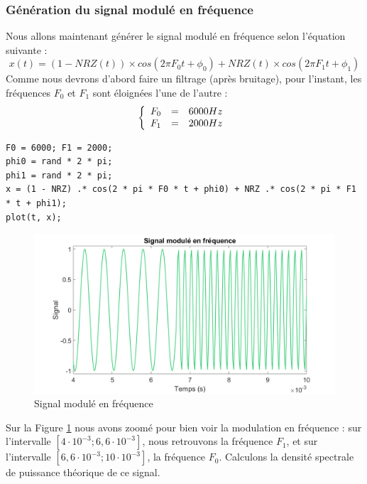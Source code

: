 \subsubsection{Génération du signal modulé en fréquence}
Nous allons maintenant générer le signal modulé en fréquence selon l'équation suivante :
\[
   x(t) = (1-NRZ(t)) \times cos(2\pi F_{0}t+\phi_{0}) + NRZ(t)\times cos(2\pi F_{1}t+\phi_{1})
\]
Comme nous devrons d'abord faire un filtrage (après bruitage), pour l'instant, les fréquences $F_{0}$ et $F_{1}$ sont éloignées l'une de l'autre :
\[
   \left\{
   \begin{array}{r c l}
      F_0 & = & 6  000  Hz \\
      F_1 & = & 2  000  Hz \\
   \end{array}
   \right.\newline
\]
\begin{lstlisting}[caption=Génération du signal modulé, label=code4]
F0 = 6000; F1 = 2000;
phi0 = rand * 2 * pi;
phi1 = rand * 2 * pi;
x = (1 - NRZ) .* cos(2 * pi * F0 * t + phi0) + NRZ .* cos(2 * pi * F1 * t + phi1);
plot(t, x);
\end{lstlisting}
\begin{figure}[ht!]
   \centering
   \includegraphics[scale=0.4]{partie-2/sous-partie-1/2.1.2.1.png}
   \caption{Signal modulé en fréquence \label{fig : signal-module}}
\end{figure}
Sur la Figure \ref{fig : signal-module} nous avons zoomé pour bien voir la modulation en fréquence : sur l'intervalle $[4\cdot 10^{-3} ; 6,6\cdot 10^{-3}]$,
nous retrouvons la fréquence $F_1$, et sur l'intervalle $[6,6\cdot 10^{-3} ; 10\cdot 10^{-3}]$, la fréquence $F_0$.
Calculons la densité spectrale de puissance théorique de ce signal.
